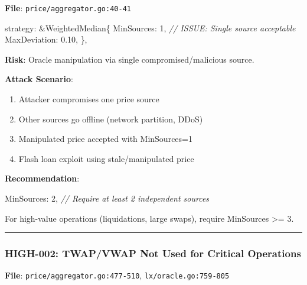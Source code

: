 \documentclass[
]{article}
\newenvironment{Shaded}{}{}
\newcommand{\CommentTok}[1]{\textcolor[rgb]{0.38,0.63,0.69}{\textit{#1}}}
\newcommand{\DecValTok}[1]{\textcolor[rgb]{0.25,0.63,0.44}{#1}}
\newcommand{\FloatTok}[1]{\textcolor[rgb]{0.25,0.63,0.44}{#1}}
\newcommand{\NormalTok}[1]{#1}
\newcommand{\OperatorTok}[1]{\textcolor[rgb]{0.40,0.40,0.40}{#1}}
\providecommand{\tightlist}{%
  \setlength{\itemsep}{0pt}\setlength{\parskip}{0pt}}
\begin{document}
\textbf{File}: \texttt{price/aggregator.go:40-41}

\begin{Shaded}
\begin{Highlighting}[]
\NormalTok{strategy}\OperatorTok{:} \OperatorTok{\&}\NormalTok{WeightedMedian}\OperatorTok{\{}
\NormalTok{    MinSources}\OperatorTok{:}   \DecValTok{1}\OperatorTok{,}  \CommentTok{// ISSUE: Single source acceptable}
\NormalTok{    MaxDeviation}\OperatorTok{:} \FloatTok{0.10}\OperatorTok{,}
\OperatorTok{\},}
\end{Highlighting}
\end{Shaded}

\textbf{Risk}: Oracle manipulation via single compromised/malicious
source.

\textbf{Attack Scenario}:

\begin{enumerate}
\def\labelenumi{\arabic{enumi}.}
\tightlist
\item
  Attacker compromises one price source
\item
  Other sources go offline (network partition, DDoS)
\item
  Manipulated price accepted with MinSources=1
\item
  Flash loan exploit using stale/manipulated price
\end{enumerate}

\textbf{Recommendation}:

\begin{Shaded}
\begin{Highlighting}[]
\NormalTok{MinSources}\OperatorTok{:} \DecValTok{2}\OperatorTok{,}  \CommentTok{// Require at least 2 independent sources}
\end{Highlighting}
\end{Shaded}

For high-value operations (liquidations, large swaps), require
MinSources \textgreater= 3.

\begin{center}\rule{0.5\linewidth}{0.5pt}\end{center}

\subsubsection{HIGH-002: TWAP/VWAP Not Used for Critical
Operations}\label{high-002-twapvwap-not-used-for-critical-operations}

\textbf{File}: \texttt{price/aggregator.go:477-510},
\texttt{lx/oracle.go:759-805}
\end{document}
